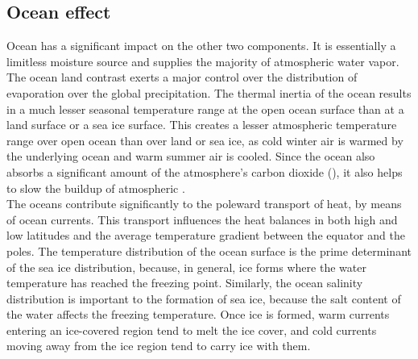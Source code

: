 \subsection{Ocean effect}\label{subsec:ocean-interconnections}
Ocean has a significant impact on the other two components.
It is essentially a limitless moisture source and supplies the majority of atmospheric water vapor. The ocean land contrast exerts a major control over the distribution of evaporation over the global precipitation. The thermal inertia of the ocean results in a much lesser seasonal temperature range at the open ocean surface than at a land surface or a sea ice surface.
This creates a lesser atmospheric temperature range over open ocean than over land or sea ice, as cold winter air is warmed by the underlying ocean and warm summer air is cooled. %
Since the ocean also absorbs a significant amount of the atmosphere’s carbon dioxide (), it also helps to slow the buildup of atmospheric . \\
[0.1 cm]
The oceans contribute significantly to the poleward transport of heat, by means of ocean currents. This transport influences the heat balances in both high and low latitudes and the average temperature gradient between the equator and the poles. The temperature distribution of the ocean surface is the prime determinant of the sea ice distribution, because, in general, ice forms where the water temperature has reached the freezing point. Similarly, the ocean salinity distribution is important to the formation of sea ice, because the salt content of the water affects the freezing temperature. Once ice is formed, warm currents entering an ice-covered region tend to melt the ice cover, and cold currents moving away from the ice region tend to carry ice with them.

